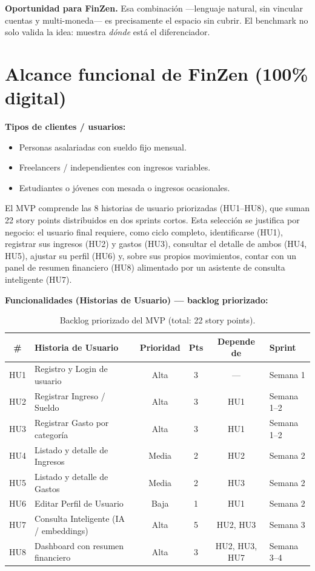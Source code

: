 \documentclass[12pt,letterpaper]{article}
\begin{document}
\textbf{Oportunidad para FinZen.} Esa combinaci\'on ---lenguaje natural, sin vincular
cuentas y multi-moneda--- es precisamente el espacio sin cubrir. El benchmark no solo
valida la idea: muestra \emph{d\'onde} est\'a el diferenciador.

\section{Alcance funcional de FinZen (100\% digital)}

\textbf{Tipos de clientes / usuarios:}
\begin{itemize}[leftmargin=1.2cm]
  \item Personas asalariadas con sueldo fijo mensual.
  \item Freelancers / independientes con ingresos variables.
  \item Estudiantes o j\'ovenes con mesada o ingresos ocasionales.
\end{itemize}

El MVP comprende las 8 historias de usuario priorizadas (HU1--HU8), que suman 22 story
points distribuidos en dos sprints cortos. Esta selecci\'on se justifica por negocio: el
usuario final requiere, como ciclo completo, identificarse (HU1), registrar sus ingresos
(HU2) y gastos (HU3), consultar el detalle de ambos (HU4, HU5), ajustar su perfil
(HU6) y, sobre sus propios movimientos, contar con un panel de resumen financiero
(HU8) alimentado por un asistente de consulta inteligente (HU7).

\textbf{Funcionalidades (Historias de Usuario) --- backlog priorizado:}

\begin{table}[H]
\centering
\small
\setlength{\tabcolsep}{4pt}
\begin{tabular}{c p{5.8cm} c c c l}
\toprule
\textbf{\#} & \textbf{Historia de Usuario} & \textbf{Prioridad} & \textbf{Pts} & \textbf{Depende de} & \textbf{Sprint} \\
\midrule
HU1 & Registro y Login de usuario & Alta & 3 & --- & Semana 1 \\
HU2 & Registrar Ingreso / Sueldo & Alta & 3 & HU1 & Semana 1--2 \\
HU3 & Registrar Gasto por categor\'ia & Alta & 3 & HU1 & Semana 1--2 \\
HU4 & Listado y detalle de Ingresos & Media & 2 & HU2 & Semana 2 \\
HU5 & Listado y detalle de Gastos & Media & 2 & HU3 & Semana 2 \\
HU6 & Editar Perfil de Usuario & Baja & 1 & HU1 & Semana 2 \\
HU7 & Consulta Inteligente (IA / embeddings) & Alta & 5 & HU2, HU3 & Semana 3 \\
HU8 & Dashboard con resumen financiero & Alta & 3 & HU2, HU3, HU7 & Semana 3--4 \\
\bottomrule
\end{tabular}
\caption{Backlog priorizado del MVP (total: 22 story points).}
\end{table}
\end{document}
